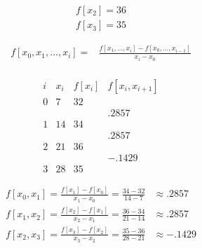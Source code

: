 \documentclass{exam}
\begin{document}
\begin{enumerate}
\begin{enumerate}
\begin{minipage}{0.1\textwidth}
\begin{align*}
                f[x_2] = 36\\
                f[x_3] = 35
            \end{align*}
        \end{minipage}
        \begin{minipage}{0.65\textwidth}
            \begin{align*}
                f[x_0,x_1,...,x_i] =& \frac{f[x_1,...,x_i] - f[x_0,...,x_{i-1}]}{x_i-x_0}\\
            \end{align*}
        \end{minipage}
        \begin{minipage}{0.3\textwidth}
            \begin{equation*}
                \begin{array}{cccc}
                    i & x_i & f[x_i]&f[x_i,x_{i+1}]\\\hline
                    0 & 7   & 32\\
                      &     &       & .2857\\
                    1 & 14  & 34    &  \\
                      &     &       & .2857\\
                    2 & 21  & 36    &  \\
                      &     &       & -.1429\\
                    3 & 28  & 35
                \end{array}
            \end{equation*}
        \end{minipage}
        \begin{minipage}{0.7\textwidth} 
            \begin{align*}
                f[x_0,x_1] = \frac{f[x_1] - f[x_0]}{x_1-x_0} = \frac{34-32}{14-7} &\approx .2857\\
                f[x_1,x_2] = \frac{f[x_2] - f[x_1]}{x_2-x_1} = \frac{36-34}{21-14} &\approx .2857\\
                f[x_2,x_3] = \frac{f[x_3] - f[x_2]}{x_3-x_2} = \frac{35-36}{28-21} &\approx -.1429\\
            \end{align*}
        \end{minipage}
        \begin{minipage}{0.415\textwidth}
            \begin{equation*}
                \begin{array}{ccccc}

\end{array}
\end{equation*}
\end{minipage}
\end{enumerate}
\end{enumerate}
\end{document}
